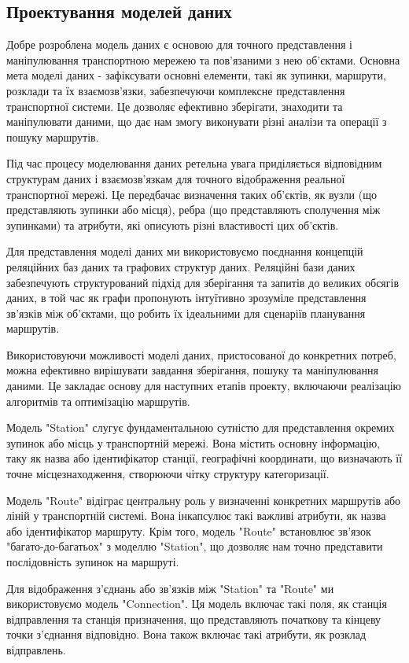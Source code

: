 \subsection{Проектування моделей даних}
\label{subsec:data-models}

Добре розроблена модель даних є основою для точного представлення і маніпулювання транспортною мережею та пов'язаними з нею об'єктами. Основна мета моделі даних - зафіксувати основні елементи, такі як зупинки, маршрути, розклади та їх взаємозв'язки, забезпечуючи комплексне представлення транспортної системи. Це дозволяє ефективно зберігати, знаходити та маніпулювати даними, що дає нам змогу виконувати різні аналізи та операції з пошуку маршрутів.

Під час процесу моделювання даних ретельна увага приділяється відповідним структурам даних і взаємозв'язкам для точного відображення реальної транспортної мережі. Це передбачає визначення таких об'єктів, як вузли (що представляють зупинки або місця), ребра (що представляють сполучення між зупинками) та атрибути, які описують різні властивості цих об'єктів.

Для представлення моделі даних ми використовуємо поєднання концепцій реляційних баз даних та графових структур даних. Реляційні бази даних забезпечують структурований підхід для зберігання та запитів до великих обсягів даних, в той час як графи пропонують інтуїтивно зрозуміле представлення зв'язків між об'єктами, що робить їх ідеальними для сценаріїв планування маршрутів.

Використовуючи можливості моделі даних, пристосованої до конкретних потреб, можна ефективно вирішувати завдання зберігання, пошуку та маніпулювання даними. Це закладає основу для наступних етапів проекту, включаючи реалізацію алгоритмів та оптимізацію маршрутів.

Модель "Station" слугує фундаментальною сутністю для представлення окремих зупинок або місць у транспортній мережі. Вона містить основну інформацію, таку як назва або ідентифікатор станції, географічні координати, що визначають її точне місцезнаходження,  створюючи чітку структуру категоризації.

Модель "Route" відіграє центральну роль у визначенні конкретних маршрутів або ліній у транспортній системі. Вона інкапсулює такі важливі атрибути, як назва або ідентифікатор маршруту. Крім того, модель "Route" встановлює зв'язок "багато-до-багатьох" з моделлю "Station", що дозволяє нам точно представити послідовність зупинок на маршруті.

Для відображення з'єднань або зв'язків між "Station" та "Route" ми використовуємо модель "Connection". Ця модель включає такі поля, як станція відправлення та станція призначення, що представляють початкову та кінцеву точки з'єднання відповідно. Вона також включає такі атрибути, як розклад відправлень.

